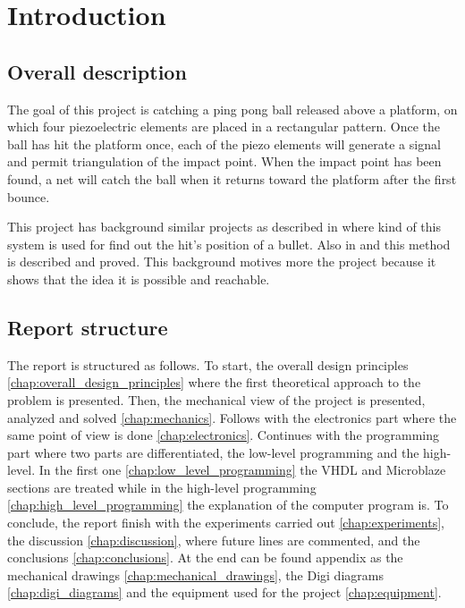 \chapter{Introduction}
\label{chap:introduction}

	\section{Overall description}
		The goal of this project is catching a ping pong ball released above a platform, on which four piezoelectric elements are placed in a rectangular pattern. 
		Once the ball has hit the platform once, each of the piezo elements will generate a signal and permit triangulation of the impact point. When the impact point has been found, a net will catch the ball when it returns toward the platform after the first bounce.

		This project has background similar projects as described in \cite{electronic_target} where kind of this system is used for find out the hit's position of a bullet. Also in \cite{tdoa_book} and \cite{tdoa_notes} this method is described and proved. This background motives more the project because it shows that the idea it is possible and reachable.

	\section{Report structure}
	\label{sec:reportStructure}
		The report is structured as follows. To start, the overall design principles \ref{chap:overall_design_principles} where the first theoretical approach to the problem is presented. 
		Then, the mechanical view of the project is presented, analyzed and solved \ref{chap:mechanics}. 
		Follows with the electronics part where the same point of view is done \ref{chap:electronics}. 
		Continues with the programming part where two parts are differentiated, the low-level programming and the high-level. 
		In the first one \ref{chap:low_level_programming} the VHDL and Microblaze sections are treated while in the high-level programming \ref{chap:high_level_programming} the explanation of the computer program is. 
		To conclude, the report finish with the experiments carried out \ref{chap:experiments}, the discussion \ref{chap:discussion}, where future lines are commented, and the conclusions \ref{chap:conclusions}.
		At the end can be found appendix as the mechanical drawings \ref{chap:mechanical_drawings}, the Digi diagrams \ref{chap:digi_diagrams} and the equipment used for the project \ref{chap:equipment}.